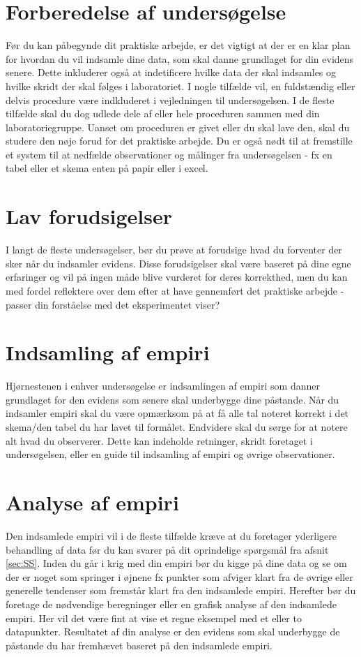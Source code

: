\section{Forberedelse af undersøgelse}
 \label{sec:FaU}
 Før du kan påbegynde dit praktiske arbejde, er det vigtigt at der er en klar plan for hvordan du vil indsamle dine data, som skal danne grundlaget for din evidens senere. Dette inkluderer også at indetificere hvilke data der skal indsamles og hvilke skridt der skal følges i laboratoriet. I nogle tilfælde vil, en fuldstændig eller delvis procedure være indkluderet i vejledningen til undersøgelsen. I de fleste tilfælde skal du dog udlede dele af eller hele proceduren sammen med din laboratoriegruppe. Uanset om proceduren er givet eller du skal lave den, skal du studere den nøje forud for det praktiske arbejde. Du er også nødt til at fremstille et system til at nedfælde observationer og målinger fra undersøgelsen - fx en tabel eller et skema enten på papir eller i excel.
 
 \section{Lav forudsigelser}
 \label{sec:LF}
 I langt de fleste undersøgelser, bør du prøve at forudsige hvad du forventer der sker når du indsamler evidens. Disse forudsigelser skal være baseret på dine egne erfaringer og vil på ingen måde blive vurderet for deres korrekthed, men du kan med fordel reflektere over dem efter at have gennemført det praktiske arbejde - passer din forståelse med det eksperimentet viser?
 
 \section{Indsamling af empiri}
 \label{sec:IaE}
 Hjørnestenen i enhver undersøgelse er indsamlingen af empiri som danner grundlaget for den evidens som senere skal underbygge dine påstande. Når du indsamler empiri skal du være opmærksom på at få alle tal noteret korrekt i det skema/den tabel du har lavet til formålet. Endvidere skal du sørge for at notere alt hvad du observerer. Dette kan indeholde retninger, skridt foretaget i undersøgelsen, eller en guide til indsamling af empiri og øvrige observationer.
 
 \section{Analyse af empiri}
 \label{sec:AaE}
 Den indsamlede empiri vil i de fleste tilfælde kræve at du foretager yderligere behandling af data før du kan svarer på dit oprindelige spørgsmål fra afsnit \vref{sec:SS}. Inden du går i krig med din empiri bør du kigge på dine data og se om der er noget som springer i øjnene fx punkter som afviger klart fra de øvrige eller generelle tendenser som fremstår klart fra den indsamlede empiri. Herefter bør du foretage de nødvendige beregninger eller en grafisk analyse af den indsamlede empiri. Her vil det være fint at vise et regne eksempel med et eller to datapunkter. Resultatet af din analyse er den evidens som skal underbygge de påstande du har fremhævet baseret på den indsamlede empiri.
 
